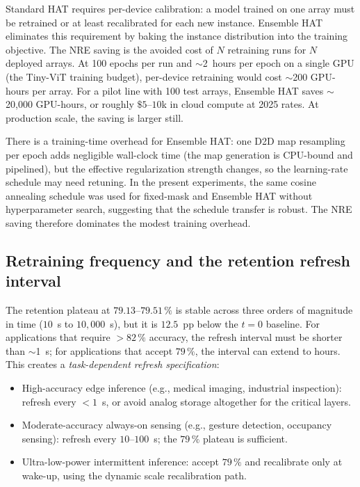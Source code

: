 Standard HAT requires per-device calibration: a model trained on one array must be retrained or at least recalibrated for each new instance.  Ensemble HAT eliminates this requirement by baking the instance distribution into the training objective.  The NRE saving is the avoided cost of $N$ retraining runs for $N$ deployed arrays.  At 100 epochs per run and $\sim$2~hours per epoch on a single GPU (the Tiny-ViT training budget), per-device retraining would cost $\sim$200 GPU-hours per array.  For a pilot line with 100 test arrays, Ensemble HAT saves $\sim$20{,}000 GPU-hours, or roughly $\$5$--$10$k in cloud compute at 2025 rates.  At production scale, the saving is larger still.

There is a training-time overhead for Ensemble HAT: one D2D map resampling per epoch adds negligible wall-clock time (the map generation is CPU-bound and pipelined), but the effective regularization strength changes, so the learning-rate schedule may need retuning.  In the present experiments, the same cosine annealing schedule was used for fixed-mask and Ensemble HAT without hyperparameter search, suggesting that the schedule transfer is robust.  The NRE saving therefore dominates the modest training overhead.

\subsection{Retraining frequency and the retention refresh interval}

The retention plateau at $79.13$--$79.51\,\%$ is stable across three orders of magnitude in time ($10$~s to $10{,}000$~s), but it is $12.5$~pp below the $t=0$ baseline.  For applications that require $>82\,\%$ accuracy, the refresh interval must be shorter than $\sim$1~s; for applications that accept $79\,\%$, the interval can extend to hours.  This creates a \emph{task-dependent refresh specification}:
\begin{itemize}
    \item High-accuracy edge inference (e.g., medical imaging, industrial inspection): refresh every $<1$~s, or avoid analog storage altogether for the critical layers.
    \item Moderate-accuracy always-on sensing (e.g., gesture detection, occupancy sensing): refresh every $10$--$100$~s; the $79\,\%$ plateau is sufficient.
    \item Ultra-low-power intermittent inference: accept $79\,\%$ and recalibrate only at wake-up, using the dynamic scale recalibration path.
\end{itemize}

